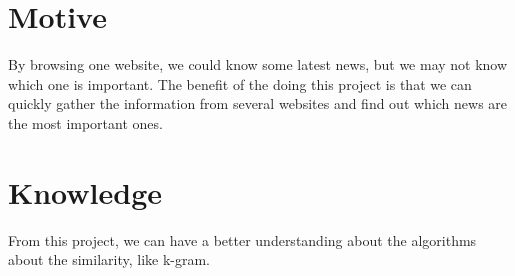 \documentclass[11pt]{article}
\begin{document}
\section{Motive}
By browsing one website, we could know some latest news, but we may not know which one is important. The benefit of the doing this project is that we can quickly gather the information from several websites and find out which news are the most important ones.

\section{Knowledge}
From this project, we can have a better understanding about the algorithms about the similarity, like k-gram.
\end{document}
